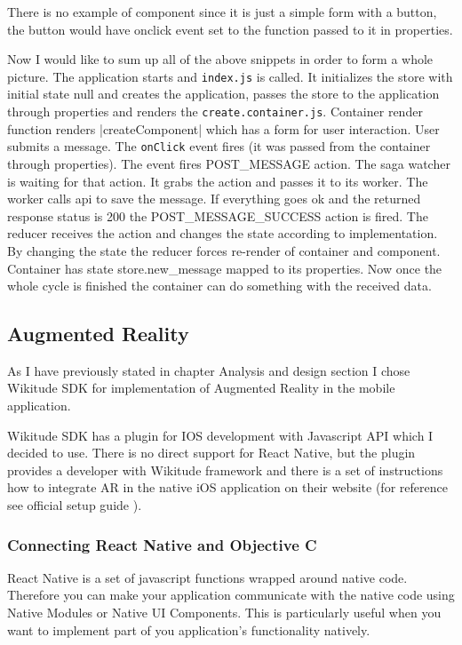 \documentclass[thesis=M,english]{FITthesis}[2012/10/20]
\begin{document}
There is no example of component since it is just a simple form with a button, the button would have onclick event set to the function passed to it in properties.

Now I would like to sum up all of the above snippets in order to form a whole picture. The application starts and \verb|index.js| is called. It initializes the store with initial state null and creates the application, passes the store to the application through properties and renders the \verb|create.container.js|. Container render function renders \ver|createComponent| which has a form for user interaction. User submits a message. The \verb|onClick| event fires (it was passed from the container through properties). The event fires POST\_MESSAGE action. The saga watcher is waiting for that action. It grabs the action and passes it to its worker. The worker calls api to save the message. If everything goes ok and the returned response status is 200 the POST\_MESSAGE\_SUCCESS action is fired. The reducer receives the action and changes the state according to implementation. By changing the state the reducer forces re-render of container and component. Container has state store.new\_message mapped to its properties. Now once the whole cycle is finished the container can do something with the received data. 

\subsection{Augmented Reality}
As I have previously stated in chapter Analysis and design section  I chose Wikitude SDK for implementation of Augmented Reality in the mobile application. 

Wikitude SDK has a plugin for IOS development with Javascript API which I decided to use. There is no direct support for React Native, but the plugin provides a developer with Wikitude framework and there is a set of instructions how to integrate AR in the native iOS application on their website (for reference see official setup guide \cite{wikitude}). 

\subsubsection{Connecting React Native and Objective C}
React Native is a set of javascript functions wrapped around native code. Therefore you can make your application communicate with the native code using Native Modules or Native UI Components. This is particularly useful when you want to implement part of you application's functionality natively.  
\end{document}
